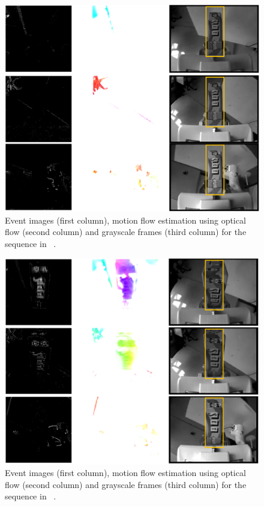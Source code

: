 \begin{figure}[H]
    \centering
    \includegraphics[width=\textwidth]{resources/images/OF_set_no_slip}
    \caption{Event images (first column), motion flow estimation using optical flow (second column) and grayscale frames (third column) for the sequence in ~.}\label{fig:OF_set_no_slip}
\end{figure}

\begin{figure}[H]
    \centering
    \includegraphics[width=\textwidth]{resources/images/OF_set_slip}
    \caption{Event images (first column), motion flow estimation using optical flow (second column) and grayscale frames (third column) for the sequence in ~.}\label{fig:OF_set_slip}
\end{figure}

